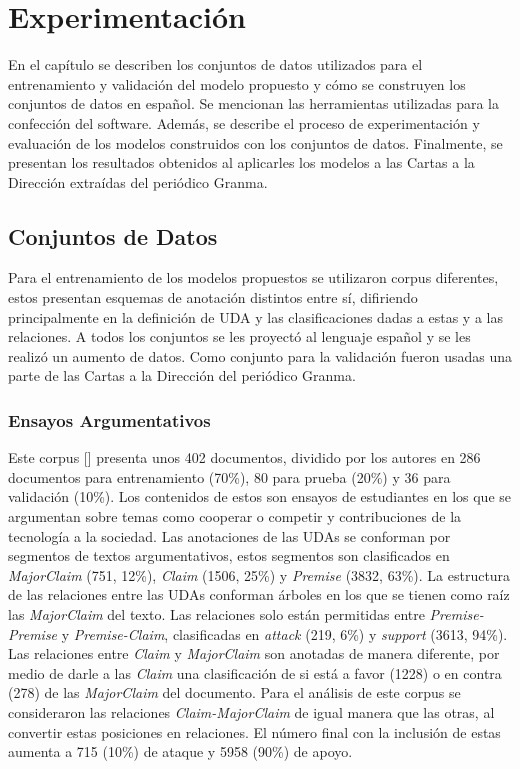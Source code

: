 \chapter{Experimentación}\label{chapter:implementation}

En el capítulo se describen los conjuntos de datos utilizados para el entrenamiento y validación del modelo 
propuesto y cómo se construyen los conjuntos de datos en español. Se mencionan las herramientas utilizadas 
para la confección del software. Además, se describe el 
proceso de experimentación y evaluación de los modelos construidos con los conjuntos de datos. Finalmente,
se presentan los resultados obtenidos al aplicarles los modelos a las Cartas a la Dirección extraídas 
del periódico Granma. 

\section{Conjuntos de Datos}

Para el entrenamiento de los modelos propuestos se utilizaron corpus diferentes, estos
presentan esquemas de anotación distintos entre sí, difiriendo principalmente en la definición de UDA y 
las clasificaciones dadas a estas y a las relaciones. A todos los conjuntos se les proyectó al lenguaje 
español y se les realizó un aumento de datos. Como conjunto para la validación fueron usadas 
una parte de las Cartas a la Dirección del periódico Granma.

\subsection{Ensayos Argumentativos}\label{corpus:persuasive_essays}

Este corpus [\cite{stab2017parsing}] presenta unos 402 documentos, dividido por los autores en 286 documentos para entrenamiento (70\%), 
80 para prueba (20\%) y 36 para validación (10\%). Los contenidos de estos son ensayos de estudiantes en los que 
se argumentan sobre temas como cooperar o competir y contribuciones de la tecnología a la sociedad.
Las anotaciones de las UDAs se conforman por segmentos de textos argumentativos, estos segmentos son 
clasificados en \emph{MajorClaim} (751, 12\%), \emph{Claim} (1506, 25\%) y \emph{Premise} (3832, 63\%).
La estructura de las relaciones entre las UDAs conforman árboles en los que se tienen como raíz las 
\emph{MajorClaim} del texto. Las relaciones solo están permitidas entre \emph{Premise-Premise} y \emph{Premise-Claim}, clasificadas
en \emph{attack} (219, 6\%) y \emph{support} (3613, 94\%). Las relaciones entre \emph{Claim} y \emph{MajorClaim} son anotadas 
de manera diferente, por medio de 
darle a las \emph{Claim} una clasificación de si está a favor (1228) o en contra (278) de las \emph{MajorClaim} del documento.
Para el análisis de este corpus se consideraron las relaciones \emph{Claim-MajorClaim} de igual manera que las otras,
al convertir estas posiciones en relaciones. El número final con la inclusión de estas aumenta a 715 (10\%) de ataque y 
5958 (90\%) de apoyo.

